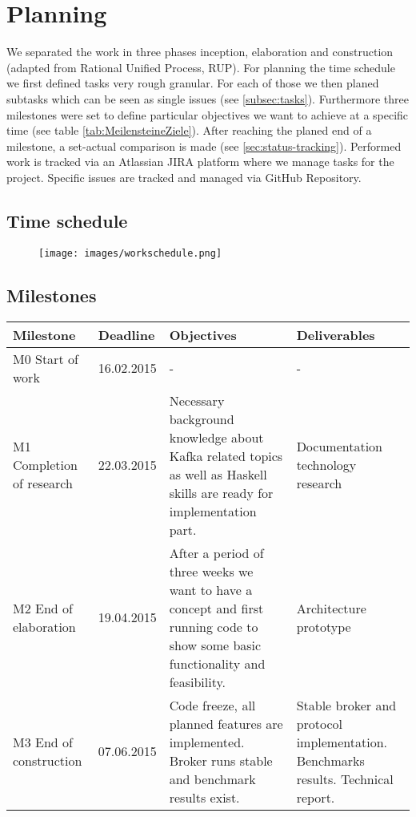 
\newpage
\section*{Planning}
We separated the work in three phases inception, elaboration and construction
(adapted from Rational Unified Process, RUP). For planning the time schedule we
first defined tasks very rough granular. For each of those we then planed
subtasks which can be seen as single issues (see \ref{subsec:tasks}).
Furthermore three milestones were set to define particular objectives we want to
achieve at a specific time (see table \ref{tab:MeilensteineZiele}).  After reaching the
planed end of a milestone, a set-actual comparison is made (see
\ref{sec:status-tracking}). Performed work is
tracked via an Atlassian JIRA platform where we manage tasks for the project.
Specific issues are tracked and managed via GitHub Repository. 


\subsection*{Time schedule}
\begin{figure}[H]
    \centering
    \texttt{[image: images/workschedule.png]}
    \label{fig:workschedule}
\end{figure}

\subsection*{Milestones}
\begin{tabular}[H]{|p{3cm}|l|p{4cm}|p{4cm}|}\hline
    \textbf{Milestone} & \textbf{Deadline} & \textbf{Objectives} & \textbf{Deliverables} \\ \hline
    M0 Start of work & 16.02.2015 & - & -\\ \hline
    M1 Completion of research  & 22.03.2015 & 
        Necessary background knowledge about Kafka related topics as well as
        Haskell skills are ready for implementation part. 
        &
        Documentation technology research \\ \hline
    M2 End of elaboration & 19.04.2015 & 
        After a period of three weeks we want to have a concept and first running
        code to show some basic functionality and feasibility. 
        &
        Architecture prototype \\ \hline
    M3 End of construction & 07.06.2015 & 
        Code freeze, all planned features are implemented. Broker runs stable and
        benchmark results exist. 
        &
        Stable broker and protocol implementation. Benchmarks results. Technical
        report.\\ \hline
\end{tabular}
\label{tab:MeilensteineZiele}

